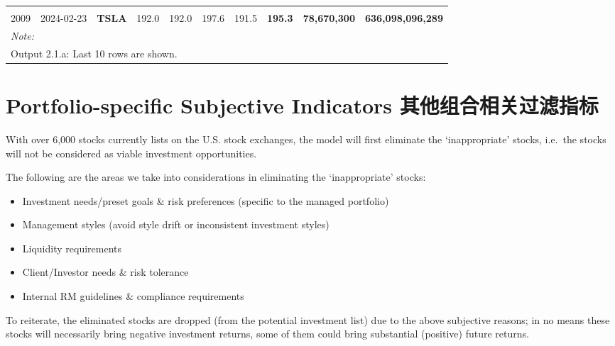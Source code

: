 \documentclass[
]{book}
\providecommand{\tightlist}{%
  \setlength{\itemsep}{0pt}\setlength{\parskip}{0pt}}
\begin{document}
\begin{table}[H]
{\begin{tabular}[t]{ll>{}lrrrr>{}r>{}r>{}r}
\cellcolor{gray!10}{2008} & \cellcolor{gray!10}{2024-02-23} & \textbf{\cellcolor{gray!10}{NVDA}} & \cellcolor{gray!10}{788.2} & \cellcolor{gray!10}{788.2} & \cellcolor{gray!10}{823.9} & \cellcolor{gray!10}{775.7} & \textbf{\cellcolor{gray!10}{807.9}} & \textbf{\cellcolor{gray!10}{82,711,200}} & \textbf{\cellcolor{gray!10}{1,967,525,024,414}}\\
2009 & 2024-02-23 & \textbf{TSLA} & 192.0 & 192.0 & 197.6 & 191.5 & \textbf{195.3} & \textbf{78,670,300} & \textbf{636,098,096,289}\\
\bottomrule
\multicolumn{10}{l}{\rule{0pt}{1em}\textit{Note: }}\\
\multicolumn{10}{l}{\rule{0pt}{1em}Output 2.1.a: Last 10 rows are shown.}\\
\end{tabular}}
\end{table}

\hypertarget{portfolio-specific-subjective-indicators-ux5176ux4ed6ux7ec4ux5408ux76f8ux5173ux8fc7ux6ee4ux6307ux6807}{%
\section{Portfolio-specific Subjective Indicators
其他组合相关过滤指标}\label{portfolio-specific-subjective-indicators-ux5176ux4ed6ux7ec4ux5408ux76f8ux5173ux8fc7ux6ee4ux6307ux6807}}

With over 6,000 stocks currently lists on the U.S. stock exchanges, the
model will first eliminate the `inappropriate' stocks, i.e.~the stocks
will not be considered as viable investment opportunities.

The following are the areas we take into considerations in eliminating
the `inappropriate' stocks:

\begin{itemize}
\tightlist
\item
  Investment needs/preset goals \& risk preferences (specific to the
  managed portfolio)
\item
  Management styles (avoid style drift or inconsistent investment
  styles)
\item
  Liquidity requirements
\item
  Client/Investor needs \& risk tolerance
\item
  Internal RM guidelines \& compliance requirements
\end{itemize}

To reiterate, the eliminated stocks are dropped (from the potential
investment list) due to the above subjective reasons; in no means these
stocks will necessarily bring negative investment returns, some of them
could bring substantial (positive) future returns.
\end{document}
